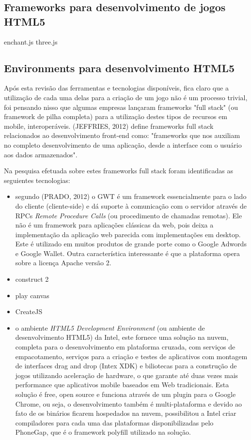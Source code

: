 \documentclass{article}
\begin{document}
\subsection{Frameworks para desenvolvimento de jogos HTML5}

enchant.js
three.js

\subsection{Environments para desenvolvimento HTML5}


Após esta revisão das ferramentas  e tecnologias disponíveis, fica claro que a utilização de cada uma delas para a criação de um jogo não é um processo trivial, foi pensando nisso que algumas empresas lançaram frameworks "full stack"  (ou framework de pilha completa) para a utilização destes tipos de recursos em mobile, interoperáveis. (JEFFRIES, 2012) define frameworks full stack relacionados ao desenvolvimento front-end como: "frameworks que nos auxiliam no completo desenvolvimento de uma aplicação, desde a interface com o usuário aos dados armazenados".

Na pesquisa efetuada sobre estes frameworks full stack foram identificadas as seguientes tecnologias:

\begin{itemize}

 \item segundo (PRADO, 2012) o GWT é um framework essencialmente para o lado do cliente (cliente-side) e dá suporte à comunicação com o servidor através de RPCs \textit{Remote Procedure Calls} (ou procedimento de chamadas remotas). Ele não é um framework para aplicações clássicas da web, pois deixa a implementação da
aplicação web parecida com implementações em desktop. Este é utilizado em muitos produtos de grande porte como o Google Adwords e Google Wallet. Outra característica interessante é que a plataforma opera sobre a licença Apache versão 2.
\item construct 2 
\item play canvas
\item CreateJS
 \item o ambiente  \textit{HTML5 Development Environment} (ou ambiente de desenvolvimento HTML5) da Intel, este fornece uma solução na nuvem, completa para o desenvolvimento em plataforma cruzada, com serviços de empacotamento, serviços para a criação e testes de aplicativos com montagem de interfaces drag and drop (Intex XDK) e biliotecas para a construção de jogos utilizando aceleração de hardware, o que garante até duas vezes mais performance que aplicativos mobile baseados em Web tradicionais. Esta solução é free, open source e funciona  através de um plugin para o Google Chrome, ou seja, o desenvolvimento também é multi-plataforma e devido ao fato de os binários ficarem hospedados na nuvem, possibilitou a  Intel criar compiladores para cada uma das plataformas disponibilizadas pelo PhoneGap, que é o framework polyfill utilizado na solução. 
\\\\
\end{itemize}
\end{document}
